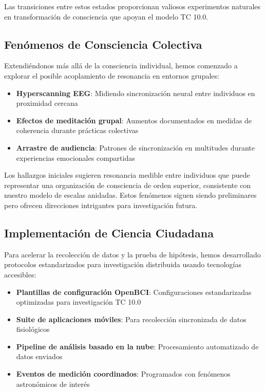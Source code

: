\documentclass[12pt]{article}
\begin{document}
Las transiciones entre estos estados proporcionan valiosos experimentos naturales en transformación de consciencia que apoyan el modelo TC 10.0.

\subsection{Fenómenos de Consciencia Colectiva}

Extendiéndonos más allá de la consciencia individual, hemos comenzado a explorar el posible acoplamiento de resonancia en entornos grupales:

\begin{itemize}
    \item \textbf{Hyperscanning EEG}: Midiendo sincronización neural entre individuos en proximidad cercana
    \item \textbf{Efectos de meditación grupal}: Aumentos documentados en medidas de coherencia durante prácticas colectivas
    \item \textbf{Arrastre de audiencia}: Patrones de sincronización en multitudes durante experiencias emocionales compartidas
\end{itemize}

Los hallazgos iniciales sugieren resonancia medible entre individuos que puede representar una organización de consciencia de orden superior, consistente con nuestro modelo de escalas anidadas. Estos fenómenos siguen siendo preliminares pero ofrecen direcciones intrigantes para investigación futura.

\subsection{Implementación de Ciencia Ciudadana}

Para acelerar la recolección de datos y la prueba de hipótesis, hemos desarrollado protocolos estandarizados para investigación distribuida usando tecnologías accesibles:

\begin{itemize}
    \item \textbf{Plantillas de configuración OpenBCI}: Configuraciones estandarizadas optimizadas para investigación TC 10.0
    \item \textbf{Suite de aplicaciones móviles}: Para recolección sincronizada de datos fisiológicos
    \item \textbf{Pipeline de análisis basado en la nube}: Procesamiento automatizado de datos enviados
    \item \textbf{Eventos de medición coordinados}: Programados con fenómenos astronómicos de interés
\end{itemize}
\end{document}

